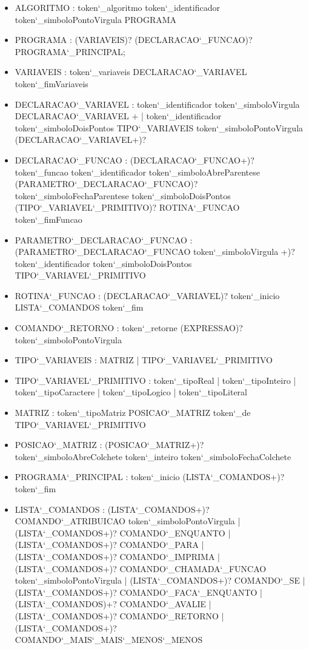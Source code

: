 \documentclass[
12pt,				%
a4paper,			%
english,			%
french,				%
spanish,			%
brazil,				%
article
]{abntex2}
\begin{document}
\begin{itemize}
	\item ALGORITMO : token\char`_algoritmo token\char`_identificador token\char`_simboloPontoVirgula PROGRAMA
	\item PROGRAMA : (VARIAVEIS)? (DECLARACAO\char`_FUNCAO)? PROGRAMA\char`_PRINCIPAL; 
	\item VARIAVEIS : token\char`_variaveis DECLARACAO\char`_VARIAVEL token\char`_fimVariaveis
	\item DECLARACAO\char`_VARIAVEL : token\char`_identificador token\char`_simboloVirgula DECLARACAO\char`_VARIAVEL $+$ | token\char`_identificador token\char`_simboloDoisPontos TIPO\char`_VARIAVEIS token\char`_simboloPontoVirgula (DECLARACAO\char`_VARIAVEL+)?
	\item DECLARACAO\char`_FUNCAO : (DECLARACAO\char`_FUNCAO+)? token\char`_funcao token\char`_identificador token\char`_simboloAbreParentese (PARAMETRO\char`_DECLARACAO\char`_FUNCAO)? token\char`_simboloFechaParentese token\char`_simboloDoisPontos (TIPO\char`_VARIAVEL\char`_PRIMITIVO)? ROTINA\char`_FUNCAO token\char`_fimFuncao
	\item PARAMETRO\char`_DECLARACAO\char`_FUNCAO : (PARAMETRO\char`_DECLARACAO\char`_FUNCAO token\char`_simboloVirgula +)?  token\char`_identificador token\char`_simboloDoisPontos TIPO\char`_VARIAVEL\char`_PRIMITIVO
	\item ROTINA\char`_FUNCAO : (DECLARACAO\char`_VARIAVEL)? token\char`_inicio LISTA\char`_COMANDOS token\char`_fim
	\item COMANDO\char`_RETORNO : token\char`_retorne (EXPRESSAO)? token\char`_simboloPontoVirgula
	\item TIPO\char`_VARIAVEIS : MATRIZ | TIPO\char`_VARIAVEL\char`_PRIMITIVO
	\item TIPO\char`_VARIAVEL\char`_PRIMITIVO : token\char`_tipoReal | token\char`_tipoInteiro | token\char`_tipoCaractere | token\char`_tipoLogico | token\char`_tipoLiteral
	\item MATRIZ : token\char`_tipoMatriz POSICAO\char`_MATRIZ token\char`_de TIPO\char`_VARIAVEL\char`_PRIMITIVO
	\item POSICAO\char`_MATRIZ : (POSICAO\char`_MATRIZ+)? token\char`_simboloAbreColchete token\char`_inteiro token\char`_simboloFechaColchete
	\item PROGRAMA\char`_PRINCIPAL : token\char`_inicio (LISTA\char`_COMANDOS+)? token\char`_fim
	\item LISTA\char`_COMANDOS : (LISTA\char`_COMANDOS+)? COMANDO\char`_ATRIBUICAO token\char`_simboloPontoVirgula | (LISTA\char`_COMANDOS+)? COMANDO\char`_ENQUANTO | (LISTA\char`_COMANDOS+)? COMANDO\char`_PARA | (LISTA\char`_COMANDOS+)? COMANDO\char`_IMPRIMA | (LISTA\char`_COMANDOS+)? COMANDO\char`_CHAMADA\char`_FUNCAO token\char`_simboloPontoVirgula | (LISTA\char`_COMANDOS+)? COMANDO\char`_SE | (LISTA\char`_COMANDOS+)? COMANDO\char`_FACA\char`_ENQUANTO | (LISTA\char`_COMANDOS)+? COMANDO\char`_AVALIE | (LISTA\char`_COMANDOS+)? COMANDO\char`_RETORNO | (LISTA\char`_COMANDOS+)? COMANDO\char`_MAIS\char`_MAIS\char`_MENOS\char`_MENOS

\end{itemize}
\end{document}
